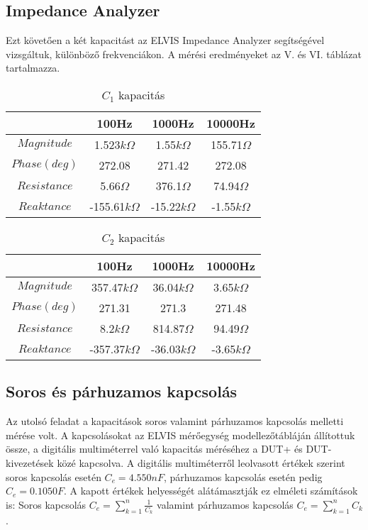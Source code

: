 \documentclass[10pt, conference,a4paper]{ITKproc}
\begin{document}
\subsection{Impedance Analyzer}
Ezt követően a két kapacitást az ELVIS Impedance Analyzer segítségével vizsgáltuk, különböző frekvenciákon. A mérési eredményeket az V. és VI. táblázat tartalmazza.  

\begin{table}[!t]
\renewcommand{\arraystretch}{1.3}
\caption{$C_1$ kapacitás}
\centering
\begin{tabular}{c||c||c||c}
\hline
\bfseries & \bfseries 100Hz & \bfseries 1000Hz & \bfseries 10000Hz\\
\hline\hline
$Magnitude$ & 1.523$k\Omega$ & 1.55$k\Omega$  & 155.71$\Omega$\\
\hline
$Phase(deg)$ & 272.08 & 271.42  & 272.08\\
\hline
$Resistance$ & 5.66$\Omega$ & 376.1$\Omega$  & 74.94$\Omega$\\
\hline
$Reaktance$ & -155.61$k\Omega$ & -15.22$k\Omega$  & -1.55$k\Omega$\\
\hline
\end{tabular}
\end{table}

\begin{table}[!t]
\renewcommand{\arraystretch}{1.3}
\caption{$C_2$ kapacitás}
\centering
\begin{tabular}{c||c||c||c}
\hline
\bfseries & \bfseries 100Hz & \bfseries 1000Hz & \bfseries 10000Hz\\
\hline\hline
$Magnitude$ & 357.47$k\Omega$ & 36.04$k\Omega$  & 3.65$k\Omega$\\
\hline
$Phase(deg)$ & 271.31 & 271.3  & 271.48\\
\hline
$Resistance$ & 8.2$k\Omega$ & 814.87$\Omega$  & 94.49$\Omega$\\
\hline
$Reaktance$ & -357.37$k\Omega$ & -36.03$k\Omega$  & -3.65$k\Omega$\\
\hline
\end{tabular}
\end{table}

\subsection{Soros és párhuzamos kapcsolás}
Az utolsó feladat a kapacitások soros valamint párhuzamos kapcsolás melletti mérése volt. A kapcsolásokat az ELVIS mérőegység modellezőtábláján állítottuk össze, a digitális multiméterrel való kapacitás méréséhez a DUT+ és DUT- kivezetések közé kapcsolva. A digitális multiméterről leolvasott értékek szerint soros kapcsolás esetén $C_e = 4.550 nF$, párhuzamos kapcsolás esetén pedig $C_e = 0.1050  F$. A kapott értékek helyességét alátámasztják ez elméleti számítások is: Soros kapcsolás $C_e = \sum_{k=1}^{n} \frac{1}{C_k}$ valamint párhuzamos kapcsolás $C_e = \sum_{k=1}^{n} C_k$. 
\end{document}
